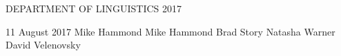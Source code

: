 \documentclass[dissertation,copyright]{uathesis}\usepackage[]{graphicx}\usepackage[]{color}
\begin{document}
\maketitlepage
{DEPARTMENT OF LINGUISTICS}	%
{2017}							

\approval
{11 August 2017}		%
{Mike Hammond}	%
{Mike Hammond}	%
{Brad Story}		%
{Natasha Warner}		%
{David Velenovsky}		%
{}		%

\statementbyauthor



\tableofcontents

\listoffigures

\listoftables
















\appendix



\renewcommand{\baselinestretch}{1}		%
\small\normalsize						%





\end{document}
